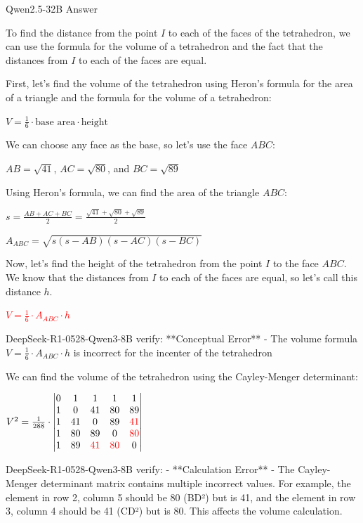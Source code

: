 \begin{answerbox}{Qwen2.5-32B Answer}


To find the distance from the point $I$ to each of the faces of the tetrahedron, we can use the formula for the volume of a tetrahedron and the fact that the distances from $I$ to each of the faces are equal.

First, let's find the volume of the tetrahedron using Heron's formula for the area of a triangle and the formula for the volume of a tetrahedron:

$V = \frac{1}{6} \cdot \text{base area} \cdot \text{height}$

We can choose any face as the base, so let's use the face $ABC$:

$AB = \sqrt{41}$, $AC = \sqrt{80}$, and $BC = \sqrt{89}$

Using Heron's formula, we can find the area of the triangle $ABC$:

$s = \frac{AB + AC + BC}{2} = \frac{\sqrt{41} + \sqrt{80} + \sqrt{89}}{2}$

$A_{ABC} = \sqrt{s(s - AB)(s - AC)(s - BC)}$

Now, let's find the height of the tetrahedron from the point $I$ to the face $ABC$. We know that the distances from $I$ to each of the faces are equal, so let's call this distance $h$.

\textcolor{red}{$V = \frac{1}{6} \cdot A_{ABC} \cdot h$}

\begin{tcolorbox}[
    colback=blue!5!white,         %
    colframe=blue!40!white,       %
]
DeepSeek-R1-0528-Qwen3-8B verify:  **Conceptual Error** - The volume formula $V = \frac{1}{6} \cdot A_{ABC} \cdot h$ is incorrect for the incenter of the tetrahedron
\end{tcolorbox}

We can find the volume of the tetrahedron using the Cayley-Menger determinant:

$V^2 = \frac{1}{288} \cdot
\begin{vmatrix}
0 & 1 & 1 & 1 & 1 \\
1 & 0 & 41 & 80 & 89 \\
1 & 41 & 0 & 89 & \textcolor{red}{41} \\
1 & 80 & 89 & 0 & \textcolor{red}{80}  \\
1 & 89 & \textcolor{red}{41}  & \textcolor{red}{80}  & 0
\end{vmatrix}$

\begin{tcolorbox}[
    colback=blue!5!white,         %
    colframe=blue!40!white,       %
]
DeepSeek-R1-0528-Qwen3-8B verify:  
- **Calculation Error** - The Cayley-Menger determinant matrix contains multiple incorrect values. For example, the element in row 2, column 5 should be 80 (BD²) but is 41, and the element in row 3, column 4 should be 41 (CD²) but is 80. This affects the volume calculation.
\end{tcolorbox}



\end{answerbox}
